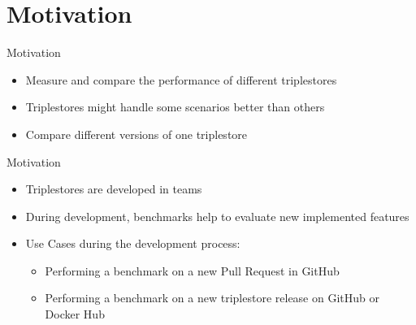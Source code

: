 \section{Motivation}
\begin{frame}{Motivation}
	
	\begin{itemize}
		\item Measure and compare the performance of different triplestores
		\item Triplestores might handle some scenarios better than others
		
		\vspace{0.5cm}
		\item Compare different versions of one triplestore
	\end{itemize}

\end{frame}
\begin{frame}{Motivation}
	\begin{itemize}		
		\item Triplestores are developed in teams
		\item During development, benchmarks help to evaluate new implemented features
		\item Use Cases during the development process:
		\begin{itemize}
			\item Performing a benchmark on a new Pull Request in GitHub
			\item Performing a benchmark on a new triplestore release on GitHub or Docker Hub
		\end{itemize}
	
		
	\end{itemize}
	
	
	
	
	
	
	
\end{frame}

